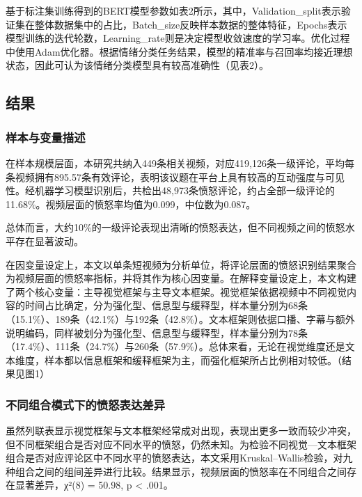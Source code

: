 \documentclass[
]{article}
\begin{document}
基于标注集训练得到的BERT模型参数如表2所示，其中，Validation\_split表示验证集在整体数据集中的占比，Batch\_size反映样本数据的整体特征，Epochs表示模型训练的迭代轮数，Learning\_rate则是决定模型收敛速度的学习率。优化过程中使用Adam优化器。根据情绪分类任务结果，模型的精准率与召回率均接近理想状态，因此可认为该情绪分类模型具有较高准确性（见表2）。

\subsection{结果}\label{ux7ed3ux679c}

\subsubsection{样本与变量描述}\label{ux6837ux672cux4e0eux53d8ux91cfux63cfux8ff0}

在样本规模层面，本研究共纳入449条相关视频，对应419,126条一级评论，平均每条视频拥有895.57条有效评论，表明该议题在平台上具有较高的互动强度与可见性。经机器学习模型识别后，共检出48,973条愤怒评论，约占全部一级评论的11.68\%。视频层面的愤怒率均值为0.099，中位数为0.087。

总体而言，大约10\%的一级评论表现出清晰的愤怒表达，但不同视频之间的愤怒水平存在显著波动。

在因变量设定上，本文以单条短视频为分析单位，将评论层面的愤怒识别结果聚合为视频层面的愤怒率指标，并将其作为核心因变量。在解释变量设定上，本文构建了两个核心变量：主导视觉框架与主导文本框架。视觉框架依据视频中不同视觉内容的时间占比确定，分为强化型、信息型与缓释型，样本量分别为68条（15.1\%）、189条（42.1\%）与192条（42.8\%）。文本框架则依据口播、字幕与额外说明编码，同样被划分为强化型、信息型与缓释型，样本量分别为78条（17.4\%）、111条（24.7\%）与260条（57.9\%）。总体来看，无论在视觉维度还是文本维度，样本都以信息框架和缓释框架为主，而强化框架所占比例相对较低。（结果见图1）

\subsubsection{不同组合模式下的愤怒表达差异}\label{ux4e0dux540cux7ec4ux5408ux6a21ux5f0fux4e0bux7684ux6124ux6012ux8868ux8fbeux5deeux5f02}

虽然列联表显示视觉框架与文本框架经常成对出现，表现出更多一致而较少冲突，但不同框架组合是否对应不同水平的愤怒，仍然未知。为检验不同视觉---文本框架组合是否对应评论区中不同水平的愤怒表达，本文采用Kruskal--Wallis检验，对九种组合之间的组间差异进行比较。结果显示，视频层面的愤怒率在不同组合之间存在显著差异，χ²(8)
= 50.98, p \textless{} .001。
\end{document}
